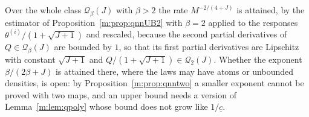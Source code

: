 Over the whole class $\mathcal Q_\beta(J)$ with $\beta>2$ the rate $M^{-2/(4+J)}$ is attained, by the estimator of Proposition~\ref{m:prop:qnnUB2} with $\beta=2$ applied to the responses $\theta^{(i)}/(1+\sqrt{J+1})$ and rescaled, because the second partial derivatives of $Q\in\mathcal Q_\beta(J)$ are bounded by $1$, so that its first partial derivatives are Lipschitz with constant $\sqrt{J+1}$ and $Q/(1+\sqrt{J+1})\in\mathcal Q_2(J)$. Whether the exponent $\beta/(2\beta+J)$ is attained there, where the laws may have atoms or unbounded densities, is open: by Proposition~\ref{m:prop:qnntwo} a smaller exponent cannot be proved with two maps, and an upper bound needs a version of Lemma~\ref{m:lem:qpoly} whose bound does not grow like $1/\underline c$.
